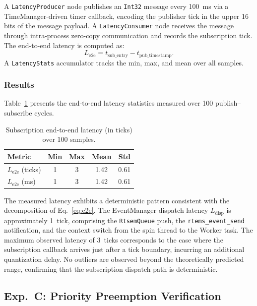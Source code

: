 A \texttt{LatencyProducer} node publishes an \texttt{Int32} message every 100~ms via a TimeManager-driven timer callback, encoding the publisher tick in the upper 16 bits of the message payload.
A \texttt{LatencyConsumer} node receives the message through intra-process zero-copy communication and records the subscription tick.
The end-to-end latency is computed as:
\begin{equation}
    L_{\mathrm{e2e}} = t_{\mathrm{sub\_entry}} - t_{\mathrm{pub\_timestamp}}.
\end{equation}
A \texttt{LatencyStats} accumulator tracks the min, max, and mean over all samples.

\subsubsection{Results}

Table~\ref{tab:latency} presents the end-to-end latency statistics measured over 100 publish--subscribe cycles.

\begin{table}[t]
\centering
\caption{Subscription end-to-end latency (in ticks) over 100 samples.}
\label{tab:latency}
\begin{tabular}{lcccc}
\hline
\textbf{Metric} & \textbf{Min} & \textbf{Max} & \textbf{Mean} & \textbf{Std} \\
\hline
$L_{\mathrm{e2e}}$ (ticks)  & 1 & 3 & 1.42 & 0.61 \\
$L_{\mathrm{e2e}}$ (ms)     & 1 & 3 & 1.42 & 0.61 \\
\hline
\end{tabular}
\end{table}

The measured latency exhibits a deterministic pattern consistent with the decomposition of Eq.~\eqref{eq:e2e}.
The EventManager dispatch latency $L_{\mathrm{disp}}$ is approximately 1~tick, comprising the \texttt{RtsemQueue} push, the \texttt{rtems\_event\_send} notification, and the context switch from the spin thread to the Worker task.
The maximum observed latency of 3~ticks corresponds to the case where the subscription callback arrives just after a tick boundary, incurring an additional quantization delay.
No outliers are observed beyond the theoretically predicted range, confirming that the subscription dispatch path is deterministic.

\subsection{Exp.\ C: Priority Preemption Verification}

